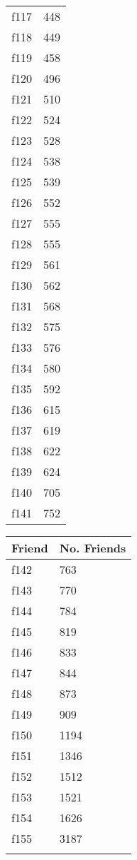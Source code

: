\begin{table}[!htbp]
\begin{center}
\begin{minipage}{0.22\textwidth}
\begin{tabular}{|l | l|}
			f117 & 448\\
			f118 & 449\\
			f119 & 458\\
			f120 & 496\\
			f121 & 510\\
			f122 & 524\\
			f123 & 528\\
			f124 & 538\\
			f125 & 539\\
			f126 & 552\\
			f127 & 555\\
			f128 & 555\\
			f129 & 561\\
			f130 & 562\\
			f131 & 568\\
			f132 & 575\\
			f133 & 576\\
			f134 & 580\\
			f135 & 592\\
			f136 & 615\\
			f137 & 619\\
			f138 & 622\\
			f139 & 624\\
			f140 & 705\\
			f141 & 752\\			
			\hline
		\end{tabular}
	\end{minipage}		
	\begin{minipage}{0.22\textwidth}
		\begin{tabular}{|l | l|}
			\hline
			\multicolumn{1}{|c|}{Friend} & \multicolumn{1}{c|}{No. Friends}\\
			\hline
			f142 & 763\\
			f143 & 770\\
			f144 & 784\\
			f145 & 819\\
			f146 & 833\\
			f147 & 844\\
			f148 & 873\\
			f149 & 909\\
			f150 & 1194\\
			f151 & 1346\\
			f152 & 1512\\
			f153 & 1521\\
			f154 & 1626\\
			f155 & 3187\\
			 & \\

\end{tabular}
\end{minipage}
\end{center}
\end{table}
